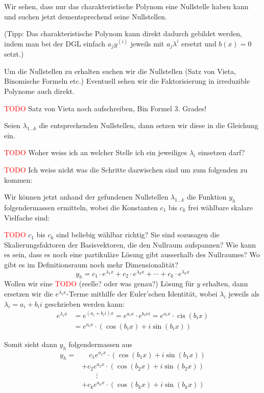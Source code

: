 \documentclass[a4paper,landscape,8pt]{extarticle}
\newcommand{\todo}{\textcolor{red}{TODO }}
\DeclareMathOperator{\cis}{cis}
\begin{document}
\begin{multicols*}{4}
\begin{warmup}
\begin{warmup}
\begin{enumerate}[label=(\arabic*)]
  Wir sehen, dass nur das charakteristische Polynom eine Nullstelle haben kann
  und suchen jetzt dementsprechend seine Nullstellen.
  
  (Tipp: Das charakteristische Polynom kann direkt dadurch gebildet werden,
  indem man bei der DGL einfach $a_jy^{(i)}$ jeweils mit $a_j\lambda^{i}$
  ersetzt und $b(x)=0$ setzt.)
  
  Um die Nullstellen zu erhalten suchen wir die Nullstellen (Satz von
  Vieta, Binomische Formeln etc.) Eventuell sehen wir die Faktorisierung in
  irreduzible Polynome auch direkt.
  
  \todo Satz von Vieta noch aufschreiben, Bin Formel 3. Grades!
  
  Seien $\lambda_{1\ldots k}$ die entsprechenden Nullstellen, dann setzen wir
  diese in die Gleichung ein.
  
  \todo Woher weiss ich an welcher Stelle ich ein jeweiliges $\lambda_i$
  einsetzen darf?
  
  \todo Ich weiss nicht was die Schritte dazwischen sind um zum folgenden zu
  kommen:
  
  Wir können jetzt anhand der gefundenen Nullstellen $\lambda_{1\ldots k}$ die
  Funktion $y_h$ folgendermassen ermitteln, wobei die Konstanten $c_1$ bis
  $c_k$ frei wählbare skalare Vielfache sind:
  
  \todo $c_1$ bis $c_k$ sind beliebig wählbar richtig? Sie sind sozusagen
  die Skalierungsfaktoren der Basisvektoren, die den Nullraum aufspannen? Wie
  kann es sein, dass es noch eine partikuläre Lösung gibt ausserhalb des
  Nullraumes? Wo gibt es im Definitionsraum noch mehr Dimensionalität?
  \[
  	y_h = c_1\cdot e^{\lambda_1x} + c_2\cdot e^{\lambda_2x} + \cdots + c_k\cdot
  	e^{\lambda_k x}
  \]
  Wollen wir eine \todo (reelle? oder was genau?) Lösung für $y$ erhalten, dann
  ersetzen wir die $e^{\lambda_i x}$-Terme mithilfe der Euler'schen Identität,
   wobei $\lambda_i$ jeweils als $\lambda_i=a_i + b_ii$ geschrieben werden kann:
  \begin{align*}
  e^{\lambda_i x} &=
  e^{(a_i + b_i i)x} = e^{a_ix}\cdot e^{b_ixi}=e^{a_ix}\cdot \cis(b_ix)\\
  &= e^{a_ix} \cdot(\cos(b_ix)+i\sin(b_ix))
  \end{align*}
  
  Somit sieht dann $y_h$ folgendermassen aus
  \begin{align*}
  y_h = &\quad c_1 e^{a_1x} \cdot (\cos(b_1x)+i\sin(b_1x))\\
      &+ c_2 e^{a_2x} \cdot (\cos(b_2x)+i\sin(b_2x))\\
      & \qquad \vdots\\
      &+ c_k e^{a_kx} \cdot (\cos(b_kx)+i\sin(b_kx))\\
  \end{align*}
  

\end{enumerate}
\end{warmup}
\end{warmup}
\end{multicols*}
\end{document}
